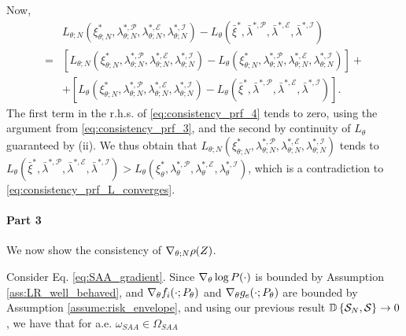 Now,
\begin{equation}\label{eq:consistency_prf_4}
\begin{split}
    &L_{\theta;N}(\xi^*_{\theta;N},\lambda^{*,\mathcal P}_{\theta;N},\lambda^{*,\mathcal E}_{\theta;N},\lambda^{*,\mathcal I}_{\theta;N}) - L_{\theta}(\bar{\xi}^*,\bar{\lambda}^{*,\mathcal P},\bar{\lambda}^{*,\mathcal E},\bar{\lambda}^{*,\mathcal I}) \\=& \left[L_{\theta;N}(\xi^*_{\theta;N},\lambda^{*,\mathcal P}_{\theta;N},\lambda^{*,\mathcal E}_{\theta;N},\lambda^{*,\mathcal I}_{\theta;N}) - L_{\theta}(\xi^*_{\theta;N},\lambda^{*,\mathcal P}_{\theta;N},\lambda^{*,\mathcal E}_{\theta;N},\lambda^{*,\mathcal I}_{\theta;N})\right] + \\ &+ \left[L_{\theta}(\xi^*_{\theta;N},\lambda^{*,\mathcal P}_{\theta;N},\lambda^{*,\mathcal E}_{\theta;N},\lambda^{*,\mathcal I}_{\theta;N}) - L_{\theta}(\bar{\xi}^*,\bar{\lambda}^{*,\mathcal P},\bar{\lambda}^{*,\mathcal E},\bar{\lambda}^{*,\mathcal I})\right].
\end{split}
\end{equation}
The first term in the r.h.s. of \eqref{eq:consistency_prf_4} tends to zero, using the argument from  \eqref{eq:consistency_prf_3}, and the second by continuity of $L_{\theta}$ guaranteed by (ii). We thus obtain that $L_{\theta;N}(\xi^*_{\theta;N},\lambda^{*,\mathcal P}_{\theta;N},\lambda^{*,\mathcal E}_{\theta;N},\lambda^{*,\mathcal I}_{\theta;N})$ tends to $L_{\theta}(\bar{\xi}^*,\bar{\lambda}^{*,\mathcal P},\bar{\lambda}^{*,\mathcal E},\bar{\lambda}^{*,\mathcal I}) > L_{\theta}(\xi^*_{\theta},\lambda^{*,\mathcal P}_{\theta},\lambda^{*,\mathcal E}_{\theta},\lambda^{*,\mathcal I}_{\theta})$, which is a contradiction to \eqref{eq:consistency_prf_L_converges}.

\paragraph{Part 3}
We now show the consistency of $\nabla_{\theta;N} \rho(Z)$.

Consider Eq. \eqref{eq:SAA_gradient}. Since $\nabla_{\theta} \log P(\cdot)$ is bounded by Assumption \ref{ass:LR_well_behaved}, and $\nabla_{\theta}{f_i(\cdot;P_{\theta})}$ and $\nabla_{\theta}{g_e(\cdot;P_{\theta})}$ are bounded by Assumption \ref{assume:risk_envelope}, and using our previous result  $\mathbb D \left\{ {\mathcal S_{N}}, {\mathcal S}\right\} \to 0$, we have that for a.e. $\omega_{SAA}\in \Omega_{SAA}$

